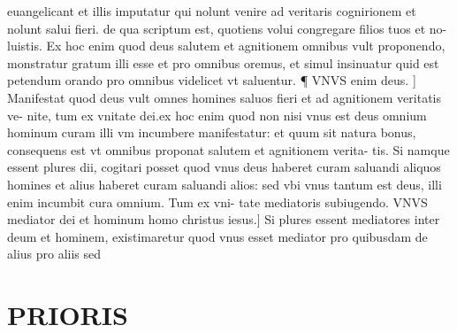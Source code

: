 \documentclass{article}
\begin{document}
\begin{pages}
euangelicant et illis imputatur qui nolunt venire ad veritaris cognirionem et nolunt salui fieri. de qua scriptum est, quotiens volui congregare filios tuos et no- luistis. Ex hoc enim quod deus salutem et agnitionem omnibus vult proponendo, monstratur gratum illi esse et pro omnibus oremus, et simul insinuatur quid est petendum orando pro omnibus videlicet vt saluentur. ¶ VNVS enim deus. ] Manifestat quod deus vult omnes homines saluos fieri et ad agnitionem veritatis ve- nite, tum ex vnitate dei.ex hoc enim quod non nisi vnus est deus omnium hominum curam illi vm incumbere manifestatur: et quum sit natura bonus, consequens est vt omnibus proponat salutem et agnitionem verita- tis. Si namque essent plures dii, cogitari posset quod vnus deus haberet curam saluandi aliquos homines et alius haberet curam saluandi alios: sed vbi vnus tantum est deus, illi enim incumbit cura omnium. Tum ex vni- tate mediatoris subiugendo. VNVS mediator dei et hominum homo christus iesus.] Si plures essent mediatores inter deum et hominem, existimaretur quod vnus esset mediator pro quibusdam de alius pro aliis sed  \pend
\section*{PRIORIS }

\end{pages}
\end{document}

